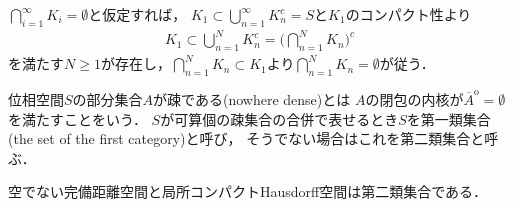 	\begin{prf}
		$\bigcap_{i=1}^\infty K_i = \emptyset$と仮定すれば，
		$K_1 \subset \bigcup_{n=1}^\infty K_n^c = S$と$K_1$のコンパクト性より
		\begin{align}
			K_1 \subset \bigcup_{n=1}^N K_n^c = \Biggl( \bigcap_{n=1}^N K_n \Biggr)^c
		\end{align}
		を満たす$N \geq 1$が存在し，$\bigcap_{n=1}^N K_n \subset K_1$より$\bigcap_{n=1}^N K_n = \emptyset$が従う．
		\QED
	\end{prf}
	
	\begin{screen}
		\begin{dfn}
			位相空間$S$の部分集合$A$が疎である(nowhere dense)とは
			$A$の閉包の内核が$\overline{A}^{\mathrm{o}} = \emptyset$を満たすことをいう．
			$S$が可算個の疎集合の合併で表せるとき$S$を第一類集合(the set of the first category)と呼び，
			そうでない場合はこれを第二類集合と呼ぶ．
		\end{dfn}
	\end{screen}
	
	\begin{screen}
		\begin{thm}[Baireの範疇定理]\label{thm:Baire_category_theorem}
			空でない完備距離空間と局所コンパクトHausdorff空間は第二類集合である．
		\end{thm}
	\end{screen}
	
